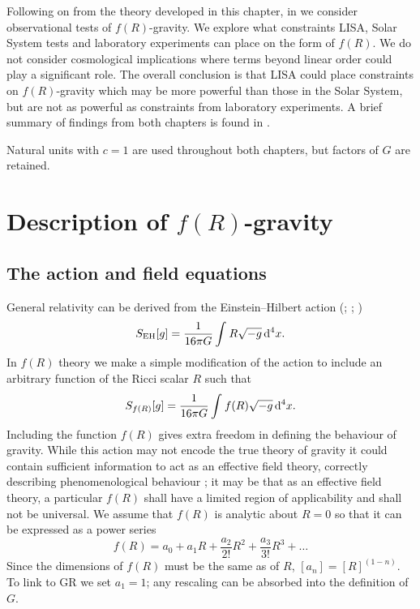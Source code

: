 Following on from the theory developed in this chapter, in  we consider observational tests of $f(R)$-gravity. We explore what constraints LISA, Solar System tests and laboratory experiments can place on the form of $f(R)$. We do not consider cosmological implications where terms beyond linear order could play a significant role. The overall conclusion is that LISA could place constraints on $f(R)$-gravity which may be more powerful than those in the Solar System, but are not as powerful as constraints from laboratory experiments. A brief summary of findings from both chapters is found in .

Natural units with $c = 1$ are used throughout both chapters, but factors of $G$ are retained.

\section{Description of $f(R)$-gravity}

\subsection{The action and field equations\label{sec:Action}}

General relativity can be derived from the Einstein--Hilbert action (\citealt[chapter 21]{Misner1973}; \citealt[section 93]{Landau1975}; \citealt[section 26]{Dirac1996})
\begin{equation}
S_\mathrm{EH}[g] = \frac{1}{16\pi G}\int_{}^{}{R\sqrt{-g}}\,\mathrm{d}{^4x}.
\end{equation}
In $f(R)$ theory we make a simple modification of the action to include an arbitrary function of the Ricci scalar $R$ such that \citep{Buchdahl1970}
\begin{equation}
S_{f(R)}[g] = \frac{1}{16\pi G}\int_{}^{}{f(R)\sqrt{-g}}\,\mathrm{d}{^4x}.
\end{equation}
Including the function $f(R)$ gives extra freedom in defining the behaviour of gravity. While this action may not encode the true theory of gravity it could contain sufficient information to act as an effective field theory, correctly describing phenomenological behaviour \citep{Park2010}; it may be that as an effective field theory, a particular $f(R)$ shall have a limited region of applicability and shall not be universal. We assume that $f(R)$ is analytic about $R = 0$ so that it can be expressed as a power series \citep{Buchdahl1970, Capozziello2007, Faulkner2007, Clifton2008, Psaltis2008}
\begin{equation}
f(R) = a_0 + a_1 R + \frac{a_2}{2!}R^2 + \frac{a_3}{3!}R^3 + \ldots
\end{equation}
Since the dimensions of $f(R)$ must be the same as of $R$, $[a_n] = [R]^{(1-n)}$. To link to GR we set $a_1 = 1$; any rescaling can be absorbed into the definition of $G$.

